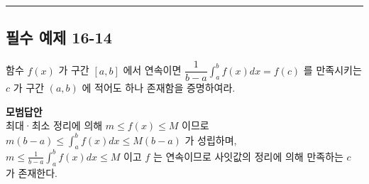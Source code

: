 \documentclass[a4paper,11pt]{article}
\begin{document}
\vspace{0.5cm}
\hrule
\vspace{0.5cm}

\subsection*{필수 예제 16-14}
함수 $f(x)$ 가 구간 $[a, b]$ 에서 연속이면 $\dfrac{1}{b-a} \int_a^b f(x) dx = f(c)$ 를 만족시키는 $c$ 가 구간 $(a, b)$ 에 적어도 하나 존재함을 증명하여라. 

\textbf{모범답안} \\
최대·최소 정리에 의해 $m \le f(x) \le M$ 이므로 $m(b-a) \le \int_a^b f(x) dx \le M(b-a)$ 가 성립하며,\\
$m \le \frac{1}{b-a} \int_a^b f(x) dx \le M$ 이고 $f$ 는 연속이므로 사잇값의 정리에 의해 만족하는 $c$ 가 존재한다. 
\end{document}
